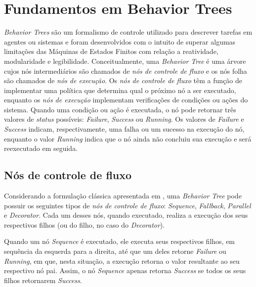 \documentclass[conference]{IEEEtran}
\begin{document}

\section{Fundamentos em Behavior Trees}

\textit{Behavior Trees} são um formalismo de controle utilizado para descrever tarefas em agentes ou sistemas e foram desenvolvidos com o intuito de superar algumas limitações das Máquinas de Estados Finitos com relação a reatividade, modularidade e legibilidade. Conceitualmente, uma \textit{Behavior Tree} é uma árvore cujos nós intermediários são chamados de \textit{nós de controle de fluxo} e os nós folha são chamados de \textit{nós de execução}. Os \textit{nós de controle de fluxo} têm a função de implementar uma política que determina qual o próximo nó a ser executado, enquanto os \textit{nós de execução} implementam verificações de condições ou ações do sistema. Quando uma condição ou ação é executada, o nó pode retornar três valores de \textit{status} possíveis: \textit{Failure}, \textit{Success} ou \textit{Running}. Os valores de \textit{Failure} e \textit{Success} indicam, respectivamente, uma falha ou um sucesso na execução do nó, enquanto o valor \textit{Running} indica que o nó ainda não concluiu sua execução e será reexecutado em seguida.

\subsection{Nós de controle de fluxo}

Considerando a formulação clássica apresentada em \cite{colledanchise_behavior_2018}, uma \textit{Behavior Tree} pode possuir os seguintes tipos de \textit{nós de controle de fluxo}: \textit{Sequence}, \textit{Fallback}, \textit{Parallel} e \textit{Decorator}. Cada um desses nós, quando executado, realiza a execução dos seus respectivos filhos (ou do filho, no caso do \textit{Decorator}).


Quando um nó \textit{Sequence} é executado, ele executa seus respectivos filhos, em sequência da esquerda para a direita, até que um deles retorne \textit{Failure} ou \textit{Running}, em que, nesta situação, a execução retorna o valor resultante ao seu respectivo nó pai. Assim, o nó \textit{Sequence} apenas retorna \textit{Success} se todos os seus filhos retornarem \textit{Success}. 
\end{document}
